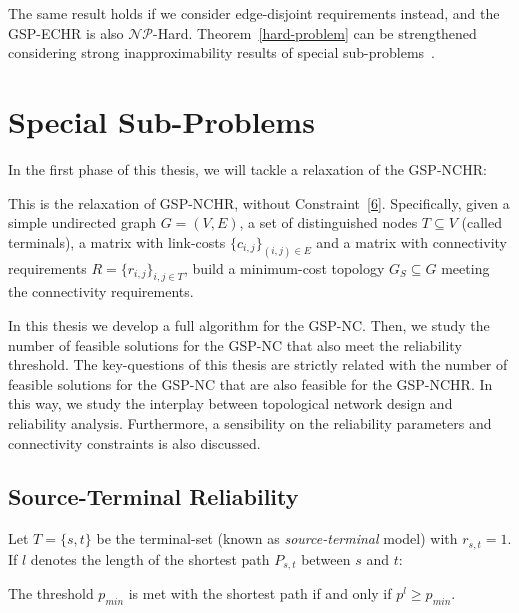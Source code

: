 The same result holds if we consider edge-disjoint requirements instead, and the GSP-ECHR is also $\mathcal{NP}$-Hard. 
Theorem~\ref{hard-problem} can be strengthened considering strong inapproximability results of special sub-problems~\cite{49}. 

\section{Special Sub-Problems}
In the first phase of this thesis, we will tackle a relaxation of the GSP-NCHR:

\begin{definition}[GSP-NC]
This is the relaxation of GSP-NCHR, without Constraint~\ref{6}.  
Specifically, given a simple undirected graph $G=(V,E)$, a set of distinguished nodes 
$T \subseteq V$ (called terminals), a matrix with link-costs $\{c_{i,j}\}_{(i,j) \in E}$ 
and a matrix with connectivity requirements $R=\{r_{i,j}\}_{i,j \in T}$, 
build a minimum-cost topology $G_S \subseteq G$ meeting the connectivity requirements.
\end{definition}

In this thesis we develop a full algorithm for the GSP-NC. 
Then, we study the number of feasible solutions for the GSP-NC that also meet the reliability threshold. 
The key-questions of this thesis are strictly related with the number of feasible solutions for the GSP-NC that are also feasible for the GSP-NCHR. In this way, we study the interplay between topological network design and reliability analysis. Furthermore, a sensibility on the reliability parameters and connectivity constraints is also discussed. 



\subsection*{Source-Terminal Reliability}
Let $T=\{s,t\}$ be the terminal-set (known as  \emph{source-terminal} model) with $r_{s,t}=1$.  
If $l$ denotes the length of the shortest path $P_{s,t}$ between $s$ and $t$: 

\begin{lemma}\label{pmin}
The threshold $p_{min}$ is met with the shortest path if and only if $p^l \geq p_{min}$.
\end{lemma}


